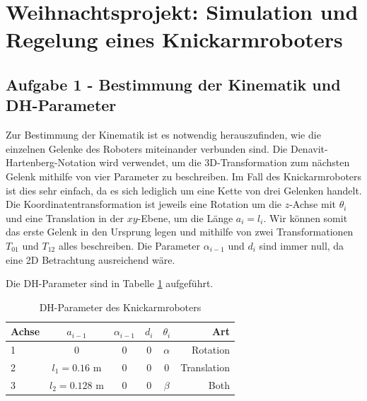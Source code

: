 \documentclass{MSM_latex}
\author{M. Denkinger, S. Eyes, J. Schnitzler}
\begin{document}
\section{Weihnachtsprojekt: Simulation und Regelung eines Knickarmroboters}

\subsection*{Aufgabe 1 - Bestimmung der Kinematik und DH-Parameter}

Zur Bestimmung der Kinematik ist es notwendig herauszufinden, wie die einzelnen Gelenke des Roboters miteinander verbunden sind.
Die Denavit-Hartenberg-Notation wird verwendet, um die 3D-Transformation zum nächsten Gelenk mithilfe von vier Parameter zu beschreiben. Im Fall des Knickarmroboters ist
dies sehr einfach, da es sich lediglich um eine Kette von drei Gelenken handelt. Die Koordinatentransformation ist jeweils eine Rotation um die $z$-Achse mit $\theta_i$
und eine Translation in der $xy$-Ebene, um die Länge $a_i = l_i$. Wir können somit das erste Gelenk in den Ursprung legen und mithilfe von zwei Transformationen $T_{01}$ und $T_{12}$ alles beschreiben. Die Parameter $\alpha_{i-1}$ und $d_i$ sind immer null, da eine 2D Betrachtung ausreichend wäre.



Die DH-Parameter sind in Tabelle \ref{tab:DH} aufgeführt.



\begin{table}[tb]
	\centering
	\begin{tabular}{lccccr}
		\toprule
		Achse & $a_{i-1}$ & $\alpha_{i-1}$ & $d_i$ & $\theta_i$ & Art \\
		\midrule
		1 & 0& 0& 0& $\alpha$& Rotation \\
		2 & $l_1 = 0.16 \text{ m}$& 0& 0& 0& Translation\\
		3 & $l_2 = 0.128 \text{ m}$& 0& 0& $\beta$& Both\\ 
		\bottomrule
	\end{tabular}
	\caption{DH-Parameter des Knickarmroboters}
	\label{tab:DH}
\end{table}
\end{document}
